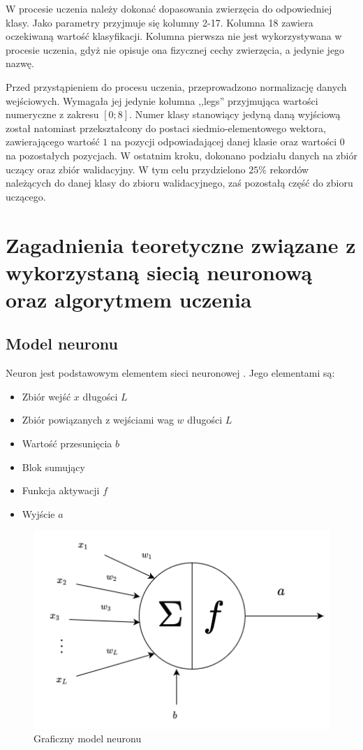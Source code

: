 \documentclass[12pt,twoside]{article}
\begin{document}
W procesie uczenia należy dokonać dopasowania zwierzęcia do odpowiedniej klasy.
Jako parametry przyjmuje się kolumny 2-17.
Kolumna 18 zawiera oczekiwaną wartość klasyfikacji.
Kolumna pierwsza nie jest wykorzystywana w procesie uczenia, gdyż nie opisuje ona fizycznej cechy zwierzęcia, a jedynie jego nazwę.

Przed przystąpieniem do procesu uczenia, przeprowadzono normalizację danych wejściowych. Wymagała jej jedynie kolumna ,,legs'' przyjmująca wartości numeryczne z zakresu $[0;8]$.
Numer klasy stanowiący jedyną daną wyjściową został natomiast przekształcony do postaci siedmio-elementowego wektora, zawierającego wartość $1$ na pozycji odpowiadającej danej klasie oraz wartości $0$ na pozostałych pozycjach.
W ostatnim kroku, dokonano podziału danych na zbiór uczący oraz zbiór walidacyjny.
W tym celu przydzielono $25\%$ rekordów należących do danej klasy do zbioru walidacyjnego, zaś pozostałą część do zbioru uczącego.

\section{Zagadnienia teoretyczne związane z wykorzystaną siecią neuronową oraz algorytmem uczenia}
\subsection{Model neuronu}
Neuron jest podstawowym elementem sieci neuronowej \cite{nndl}.
Jego elementami są:
\begin{itemize}
	\item Zbiór wejść $x$ długości $L$
	\item Zbiór powiązanych z wejściami wag $w$ długości $L$
	\item Wartość przesunięcia $b$
	\item Blok sumujący
	\item Funkcja aktywacji $f$
	\item Wyjście $a$
\end{itemize}


\begin{figure}[ht]
	\centering
	\includegraphics[width=12cm]{figures/models/neuronModel.png}
	\caption{Graficzny model neuronu \cite{kiaNeuron}}
	\label{Fig:neuron}
\end{figure}
\end{document}
